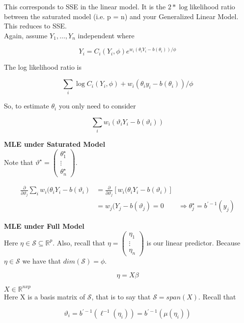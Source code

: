 \documentclass[11pt,fleqn]{book} %
\begin{document}
This corresponds to SSE in the linear model. It is the $2*\log$likelihood ratio between the saturated model (i.e. p = n) and your Generalized Linear Model. This reduces to SSE. \\

Again, assume $Y_1, \dots, Y_n$ independent where
		
		$$Y_i = C_i (Y_i ,\phi) e^{w_i (\theta_i Y_i - b(\theta_i))/\phi} $$

The log likelihood ratio is

		$$\sum_i \log C_i(Y_i, \phi) + w_i(\theta_iy_i - b(\theta_i)) /\phi$$

So, to estimate $\theta_i$ you only need to consider

		$$\sum_i w_i (\vartheta_i Y_i - b(\vartheta_i)) $$

\textbf{MLE under Saturated Model}\\

Note that $\vartheta^\star = \begin{pmatrix}
	\theta_1^\star\\
	\vdots\\
	\theta_n^\star
\end{pmatrix}$. 

		\begin{align*}
			\frac{\partial}{\partial \vartheta_j} \sum_i w_i (\theta_i Y_i - b(\vartheta_i) &= \frac{\partial}{\partial \vartheta_j} [ w_i (\theta_i Y_i - b(\vartheta_i)]\\
				&=  w_j ( Y_j - b(\vartheta_j) = 0
				&\Rightarrow \theta^\star_j = b^{'-1}(y_j)
		\end{align*}


\textbf{MLE under Full Model}\\

Here $\eta \in \mathcal{S} \subseteq \mathbb{R}^p$. Also, recall that $\eta = \begin{pmatrix}
	\eta_1\\
	\vdots\\
	\eta_n
\end{pmatrix}$ is our linear predictor. Because $\eta \in \mathcal{S}$ we have that $dim(\mathcal{S}) = \phi$. 

		$$\eta = X \beta $$

$X \in \mathbb{R}^{nxp}$\\

Here X is a basis matrix of $\mathcal{S}$, that is to say that $\mathcal{S}  = span(X)$. Recall that

		$$\vartheta_i = b^{'-1}(\ell^{-1}(\eta_i)) = b^{'-1}(\mu(\eta_i)) $$
\end{document}
